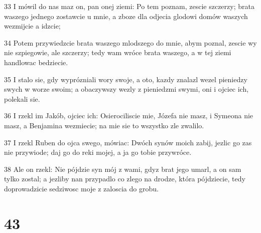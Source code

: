 \par 33 I mówil do nas maz on, pan onej ziemi: Po tem poznam, zescie szczerzy; brata waszego jednego zostawcie u mnie, a zboze dla odjecia glodowi domów waszych wezmijcie a idzcie;
\par 34 Potem przywiedzcie brata waszego mlodszego do mnie, abym poznal, zescie wy nie szpiegowie, ale szczerzy; tedy wam wróce brata waszego, a w tej ziemi handlowac bedziecie.
\par 35 I stalo sie, gdy wyprózniali wory swoje, a oto, kazdy znalazl wezel pieniedzy swych w worze swoim; a obaczywszy wezly z pieniedzmi swymi, oni i ojciec ich, polekali sie.
\par 36 I rzekl im Jakób, ojciec ich: Osierociliscie mie, Józefa nie masz, i Symeona nie masz, a Benjamina wezmiecie; na mie sie to wszystko zle zwalilo.
\par 37 I rzekl Ruben do ojca swego, mówiac: Dwóch synów moich zabij, jezlic go zas nie przywiode; daj go do reki mojej, a ja go tobie przywróce.
\par 38 Ale on rzekl: Nie pójdzie syn mój z wami, gdyz brat jego umarl, a on sam tylko zostal; a jezliby nan przypadlo co zlego na drodze, która pójdziecie, tedy doprowadzicie sedziwosc moje z zaloscia do grobu.

\chapter{43}

